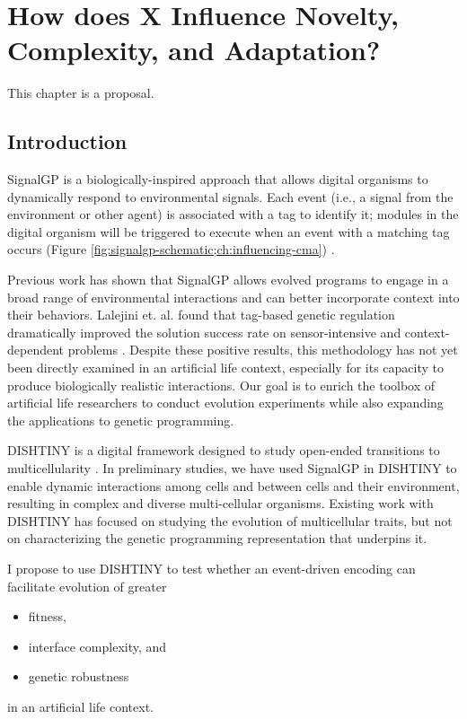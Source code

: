 \chapter{How does X Influence Novelty, Complexity, and Adaptation?}
\label{ch:influencing-cna}

\noindent
This chapter is a proposal.

\section{Introduction}

SignalGP is a biologically-inspired approach that allows digital organisms to dynamically respond to environmental signals.
Each event (i.e., a signal from the environment or other agent) is associated with a tag to identify it; modules in the digital organism will be triggered to execute when an event with a matching tag occurs (Figure \ref{fig:signalgp-schematic;ch:influencing-cma}) \citep{lalejini2018evolving}.

Previous work has shown that SignalGP allows evolved programs to engage in a broad range of environmental interactions and can better incorporate context into their behaviors.
Lalejini et. al. found that tag-based genetic regulation dramatically improved the solution success rate on sensor-intensive and context-dependent problems \citep{lalejini2018evolving, lalejini2021tag}.
Despite these positive results, this methodology has not yet been directly examined in an artificial life context, especially for its capacity to produce biologically realistic interactions.
Our goal is to enrich the toolbox of artificial life researchers to conduct evolution experiments while also expanding the applications to genetic programming.



DISHTINY is a digital framework designed to study open-ended transitions to multicellularity \citep{moreno2019toward}.
In preliminary studies, we have used SignalGP in DISHTINY to enable dynamic interactions among cells and between cells and their environment, resulting in complex and diverse multi-cellular organisms.
Existing work with DISHTINY has focused on studying the evolution of multicellular traits, but not on characterizing the genetic programming representation that underpins it.

I propose to use DISHTINY to test whether an event-driven encoding can facilitate evolution of greater
\begin{itemize}
  \item fitness,
  \item interface complexity, and
  \item genetic robustness
\end{itemize}
in an artificial life context.


